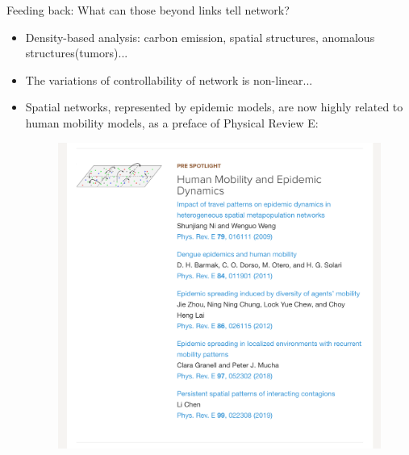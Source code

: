 \begin{frame}{Feeding back: What can those beyond links tell network?}

\begin{itemize}
    \item Density-based analysis: carbon emission, spatial structures, anomalous structures(tumors)...
    \item The variations of controllability of network is non-linear...
    \item Spatial networks, represented by epidemic models, are now highly related to human mobility models, as a preface of Physical Review E:
    \begin{figure}
        \centering
        \includegraphics[width = 0.5\linewidth]{Pics/preface.png}
    \end{figure}
\end{itemize}
    
\end{frame}

